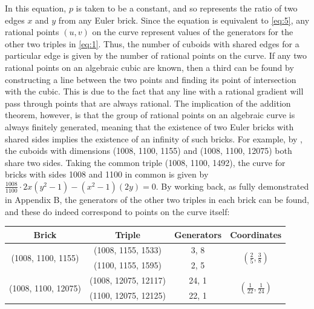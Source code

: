 \documentclass[11pt]{article}
\begin{document}
In this equation, $p$ is taken to be a constant, and so represents the ratio of two edges $x$ and $y$ from any Euler brick. Since the equation is equivalent to \eqref{eq:5}, any rational points $(u, v)$ on the curve represent values of the generators for the other two triples in \eqref{eq:1}. Thus, the number of cuboids with shared edges for a particular edge is given by the number of rational points on the curve. If any two rational points on an algebraic cubic are known, then a third can be found by constructing a line between the two points and finding its point of intersection with the cubic. This is due to the fact that any line with a rational gradient will pass through points that are always rational. The implication of the addition theorem, however, is that the group of rational points on an algebraic curve is always finitely generated, meaning that the existence of two Euler bricks with shared sides implies the existence of an infinity of such bricks. For example, by \cite{bricklist}, the cuboids with dimensions (1008, 1100, 1155) and (1008, 1100, 12075) both share two sides. Taking the common triple (1008, 1100, 1492), the curve for bricks with sides 1008 and 1100 in common is given by $\frac{1008}{1100}\cdot2x(y^2-1)-(x^2-1)(2y)=0$. By working back, as fully demonstrated in Appendix B, the generators of the other two triples in each brick can be found, and these do indeed correspond to points on the curve itself:
\begin{table}[H]
  \begin{tabular}{| c | c | c | c |}
	\hline
	Brick & Triple & Generators & Coordinates\\
	\hline \hline 
	\multirow{2}{*}{(1008, 1100, 1155)} & (1008, 1155, 1533) & {3, 8} & \multirow{2}{*}{$(\frac{2}{5}, \frac{3}{8})$} \\ \cline{2-3}
	& (1100, 1155, 1595) & {2, 5} & \\ \hline
	\multirow{2}{*}{(1008, 1100, 12075)} & (1008, 12075, 12117) & {24, 1} & \multirow{2}{*}{$(\frac{1}{22}, \frac{1}{24})$} \\ \cline{2-3}
    & (1100, 12075, 12125) & {22, 1} & \\ \hline
  \end{tabular}
\end{table}
\end{document}
